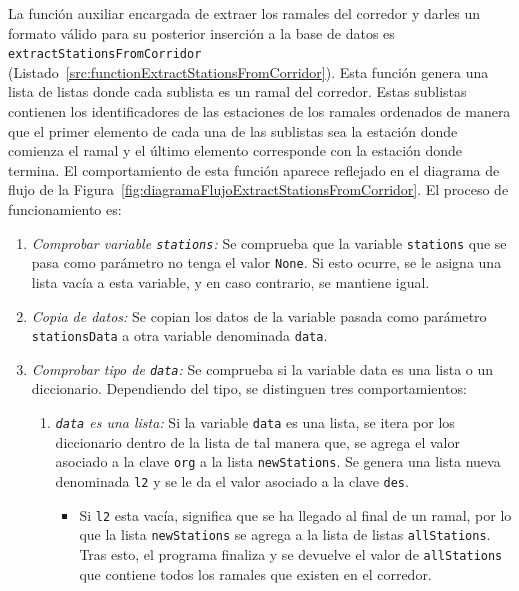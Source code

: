 La función auxiliar encargada de extraer los ramales del corredor y darles un formato válido para su posterior inserción a la base de datos es \texttt{extractStationsFromCorridor} (Listado~\ref{src:functionExtractStationsFromCorridor}). Esta función genera una lista de listas donde cada sublista es un ramal del corredor. Estas sublistas contienen los identificadores de las estaciones de los ramales ordenados de manera que el primer elemento de cada una de las sublistas sea la estación donde comienza el ramal y el último elemento corresponde con la estación donde termina. El comportamiento de esta función aparece reflejado en el diagrama de flujo de la Figura~\ref{fig:diagramaFlujoExtractStationsFromCorridor}. El proceso de funcionamiento es:
    \begin{enumerate}
        \item \textit{Comprobar variable \texttt{stations}:} Se comprueba que la variable \texttt{stations} que se pasa como parámetro no tenga el valor \texttt{None}. Si esto ocurre, se le asigna una lista vacía a esta variable, y en caso contrario, se mantiene igual.
        
        \item \textit{Copia de datos:} Se copian los datos de la variable pasada como parámetro \texttt{stationsData} a otra variable denominada \texttt{data}.
        
        \item \textit{Comprobar tipo de \texttt{data}:} Se comprueba si la variable data es una lista o un diccionario. Dependiendo del tipo, se distinguen tres comportamientos:
        
            \begin{enumerate}
                \item \textit{\texttt{data} es una lista:} Si la variable \texttt{data} es una lista, se itera por los diccionario dentro de la lista de tal manera que, se agrega el valor asociado a la clave \texttt{org} a la lista \texttt{newStations}. Se genera una lista nueva denominada \texttt{l2} y se le da el valor asociado a la clave \texttt{des}.
                    \begin{itemize}
                        \item Si \texttt{l2} esta vacía, significa que se ha llegado al final de un ramal, por lo que la lista \texttt{newStations} se agrega a la lista de listas \texttt{allStations}. Tras esto, el programa finaliza y se devuelve el valor de \texttt{allStations} que contiene todos los ramales que existen en el corredor.
                        

\end{itemize}
\end{enumerate}
\end{enumerate}
